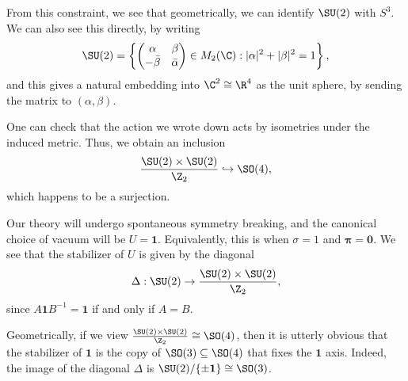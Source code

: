 \documentclass[a4paper]{article}
\begin{document}
From this constraint, we see that geometrically, we can identify $\SU(2)$ with $S^3$. We can also see this directly, by writing
\[
  \SU(2) =\left\{
  \begin{pmatrix}
    \alpha & \beta\\
    -\bar{\beta} & \bar{\alpha}
  \end{pmatrix} \in M_2(\C): |\alpha|^2 + |\beta|^2 = 1\right\},
\]
and this gives a natural embedding into $\C^2 \cong \R^4$ as the unit sphere, by sending the matrix to $(\alpha, \beta)$.

One can check that the action we wrote down acts by isometries under the induced metric. Thus, we obtain an inclusion
\[
  \frac{\SU(2) \times \SU(2)}{\Z_2} \hookrightarrow \SO(4),
\]
which happens to be a surjection.

Our theory will undergo spontaneous symmetry breaking, and the canonical choice of vacuum will be $U = \mathbf{1}$. Equivalently, this is when $\sigma = 1$ and $\boldsymbol\pi = \mathbf{0}$. We see that the stabilizer of $U$ is given by the diagonal
\[
  \Delta : \SU(2) \rightarrow \frac{\SU(2) \times \SU(2)}{\Z_2},
\]
since $A\mathbf{1}B^{-1} = \mathbf{1}$ if and only if $A = B$.

Geometrically, if we view $\frac{\SU(2) \times \SU(2)}{\Z_2} \cong \SO(4)$, then it is utterly obvious that the stabilizer of $\mathbf{1}$ is the copy of $\SO(3) \subseteq \SO(4)$ that fixes the $\mathbf{1}$ axis. Indeed, the image of the diagonal $\Delta$ is $\SU(2)/\{\pm \mathbf{1}\} \cong \SO(3)$.

%
%
\end{document}
